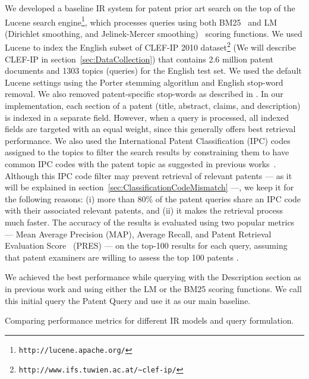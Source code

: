 We developed a baseline IR system for patent prior art search on the top of
the Lucene search engine\footnote{\texttt{http://lucene.apache.org/}}, which processes queries using both BM25~\citep{Robertson1993} and LM (Dirichlet
smoothing, and Jelinek-Mercer smoothing)~\citep{zhai2004study} scoring functions. %
We used Lucene to index the English subset of CLEF-IP 2010 dataset\footnote{\texttt{http://www.ifs.tuwien.ac.at/\textasciitilde{}clef-ip/}} 
(We will describe CLEF-IP in section~\ref{sec:DataCollection}) that contains 2.6 million patent documents and 1303 topics (queries) for the English test set.
We used the default Lucene settings using the Porter stemming algorithm \cite{Porter1980} and English stop-word removal. 
We also removed patent-specific stop-words as described in \cite{magdy2012toward}.
In
our implementation, each section of a patent (title, abstract, claims,
and description) is indexed in a separate field. However, when a query 
is processed, all indexed fields are targeted with an equal weight, since this generally
offers best retrieval performance. We also used the International
Patent Classification (IPC) codes assigned to the topics to filter
the search results by constraining them to have common IPC codes with
the patent topic as suggested in previous works~\citep{lopez2010patatras}.
Although this IPC code filter may prevent retrieval of relevant patents 
--- as it will be explained in section~\ref{sec:ClassificationCodeMismatch} ---, we
keep it for the following reasons: (i) more than 80\%
of the patent queries share an IPC code with their associated relevant
patents, and (ii) it makes the retrieval process much faster. The accuracy of the results is evaluated 
using two popular metrics --- Mean Average Precision (MAP), Average Recall, and Patent Retrieval Evaluation 
Score~\citep{magdy2012toward} (PRES) --- on the top-100 results for each query, assuming that patent examiners 
are willing to assess the top 100 patents \citep{joho2010survey}. 

We achieved the best performance while querying with the Description
section as in previous work \citep{xue2009transforming} and using
either the LM or the BM25 scoring functions. 
We call this initial 
query the Patent Query and use it as our main baseline.
\begin{table*}[t!]
  \begin{center}
  \caption{Comparing performance metrics for different IR models and query formulation.}
   
  \label{tab:IRmodels_Sections}
  \end{center}  
\end{table*}

